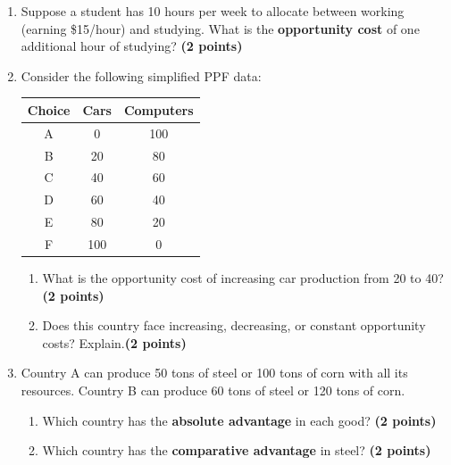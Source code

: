 \documentclass[12pt]{article}
\begin{document}
\begin{enumerate}[resume]
    \item Suppose a student has 10 hours per week to allocate between working (earning \$15/hour) and studying. What is the \textbf{opportunity cost} of one additional hour of studying? \textbf{(2 points)}

    \item Consider the following simplified PPF data:

    \begin{center}
    \begin{tabular}{ccc}
    \toprule
    Choice & Cars & Computers \\
    \midrule
    A & 0 & 100 \\
    B & 20 & 80 \\
    C & 40 & 60 \\
    D & 60 & 40 \\
    E & 80 & 20 \\
    F & 100 & 0 \\
    \bottomrule
    \end{tabular}
    \end{center}

    \begin{enumerate}
        \item What is the opportunity cost of increasing car production from 20 to 40?  \textbf{(2 points)}
        \item Does this country face increasing, decreasing, or constant opportunity costs? Explain.\textbf{(2 points)}
    \end{enumerate}

    \item Country A can produce 50 tons of steel or 100 tons of corn with all its resources. Country B can produce 60 tons of steel or 120 tons of corn.
    \begin{enumerate}
        \item Which country has the \textbf{absolute advantage} in each good?  \textbf{(2 points)}
        \item Which country has the \textbf{comparative advantage} in steel?  \textbf{(2 points)}
    \end{enumerate}
\end{enumerate}
\end{document}
